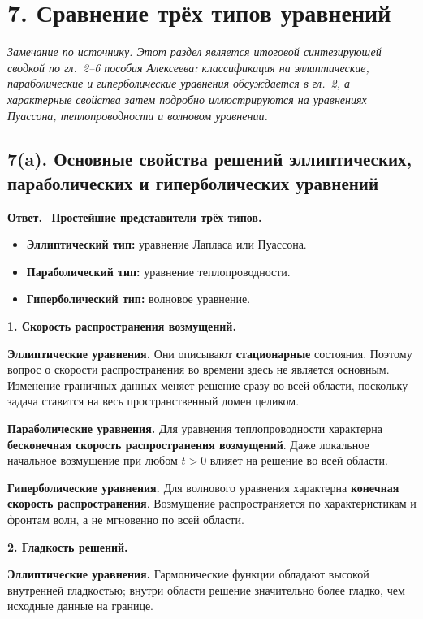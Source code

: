 \documentclass[a4paper,12pt]{article}
\newcommand{\Answer}{\textbf{Ответ.}\ }
\begin{document}
\section*{7. Сравнение трёх типов уравнений}

\textit{Замечание по источнику. Этот раздел является итоговой синтезирующей сводкой по гл.~2--6 пособия Алексеева: классификация на эллиптические, параболические и гиперболические уравнения обсуждается в гл.~2, а характерные свойства затем подробно иллюстрируются на уравнениях Пуассона, теплопроводности и волновом уравнении.}

\subsection*{7(a). Основные свойства решений эллиптических, параболических и гиперболических уравнений}

\Answer
\textbf{Простейшие представители трёх типов.}
\begin{itemize}
  \item \textbf{Эллиптический тип:} уравнение Лапласа или Пуассона.
  \item \textbf{Параболический тип:} уравнение теплопроводности.
  \item \textbf{Гиперболический тип:} волновое уравнение.
\end{itemize}

\textbf{1. Скорость распространения возмущений.}

\textbf{Эллиптические уравнения.}
Они описывают \textbf{стационарные} состояния. Поэтому вопрос о скорости распространения во времени здесь не является основным. Изменение граничных данных меняет решение сразу во всей области, поскольку задача ставится на весь пространственный домен целиком.

\textbf{Параболические уравнения.}
Для уравнения теплопроводности характерна \textbf{бесконечная скорость распространения возмущений}. Даже локальное начальное возмущение при любом $t>0$ влияет на решение во всей области.

\textbf{Гиперболические уравнения.}
Для волнового уравнения характерна \textbf{конечная скорость распространения}. Возмущение распространяется по характеристикам и фронтам волн, а не мгновенно по всей области.

\textbf{2. Гладкость решений.}

\textbf{Эллиптические уравнения.}
Гармонические функции обладают высокой внутренней гладкостью; внутри области решение значительно более гладко, чем исходные данные на границе.
\end{document}
